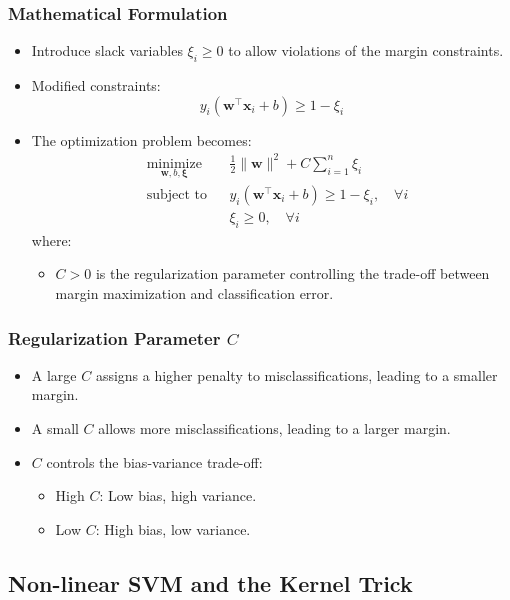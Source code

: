 \documentclass{article}
\begin{document}
\subsubsection{Mathematical Formulation}

\begin{itemize}
    \item Introduce slack variables $\xi_i \geq 0$ to allow violations of the margin constraints.
    \item Modified constraints:
    \[
    y_i (\mathbf{w}^\top \mathbf{x}_i + b) \geq 1 - \xi_i
    \]
    \item The optimization problem becomes:
    \[
    \begin{aligned}
    & \underset{\mathbf{w}, b, \boldsymbol{\xi}}{\text{minimize}} && \frac{1}{2} \|\mathbf{w}\|^2 + C \sum_{i=1}^n \xi_i \\
    & \text{subject to} && y_i (\mathbf{w}^\top \mathbf{x}_i + b) \geq 1 - \xi_i, \quad \forall i \\
    &&& \xi_i \geq 0, \quad \forall i
    \end{aligned}
    \]
    where:
    \begin{itemize}
        \item $C > 0$ is the regularization parameter controlling the trade-off between margin maximization and classification error.
    \end{itemize}
\end{itemize}

\subsubsection{Regularization Parameter $C$}

\begin{itemize}
    \item A large $C$ assigns a higher penalty to misclassifications, leading to a smaller margin.
    \item A small $C$ allows more misclassifications, leading to a larger margin.
    \item $C$ controls the bias-variance trade-off:
    \begin{itemize}
        \item High $C$: Low bias, high variance.
        \item Low $C$: High bias, low variance.
    \end{itemize}
\end{itemize}

\subsection{Non-linear SVM and the Kernel Trick}
\end{document}
